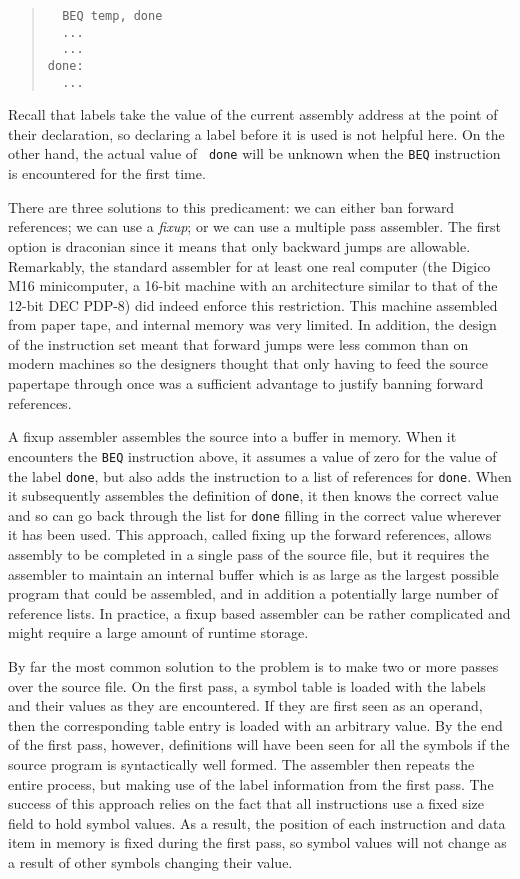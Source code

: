 \begin{quote}
\small
\begin{verbatim}
  BEQ temp, done
  ...
  ...
done:
  ...
\end{verbatim}
\end{quote}

Recall that labels take the value of the current assembly address at the point
of their declaration, so declaring a label before it is used is not
helpful here. On the other hand, the actual value of {\tt
done} will be unknown when the {\tt BEQ} instruction is encountered for
the first time.

There are three solutions to this predicament: we can either ban forward
references; we can use a {\em fixup}; or we can use a multiple pass
assembler. The first option is draconian since it means that only
backward jumps are allowable. Remarkably, the standard assembler for at
least one real computer (the Digico M16 minicomputer, a 16-bit machine
with an architecture similar to that of the 12-bit DEC PDP-8) did indeed
enforce this restriction. This machine assembled from paper tape, and
internal memory was very limited. In addition, the design of the
instruction set meant that forward jumps were less common than on modern
machines so the designers thought that only having to feed the source
papertape through once was a sufficient advantage to justify banning
forward references.

A fixup assembler assembles the source into a buffer in memory. When it
encounters the {\tt BEQ} instruction above, it assumes a value of zero
for the value of the label {\tt done}, but also adds the instruction to
a list of references for {\tt done}. When it subsequently assembles the definition of
{\tt done}, it then knows the correct value and so can go back through
the list for {\tt done} filling in the correct value wherever it has
been used. This approach, called fixing up the forward references, allows assembly to be completed in a single
pass of the source file, but it requires the assembler to maintain an
internal buffer which is as large as the largest possible program that
could be assembled, and in addition a potentially large number of
reference lists. In practice, a fixup based assembler can be rather
complicated and might require a large amount of runtime storage.

By far the most common solution to the problem is to make two or more
passes over the source file. On the first pass, a symbol table is loaded
with the labels and their values as they are encountered. If they are
first seen as an operand, then the corresponding table entry is loaded
with an arbitrary value. By the end of the first pass, however,
definitions will have been seen for all the symbols if the source
program is syntactically well formed. The assembler then repeats the
entire process, but making use of the label information from the first
pass. The success of this approach relies on the fact that all
instructions use a fixed size field to hold symbol values. As a result,
the position of each instruction and data item in memory is fixed during
the first pass, so symbol values will not change as a result of other
symbols changing their value.

